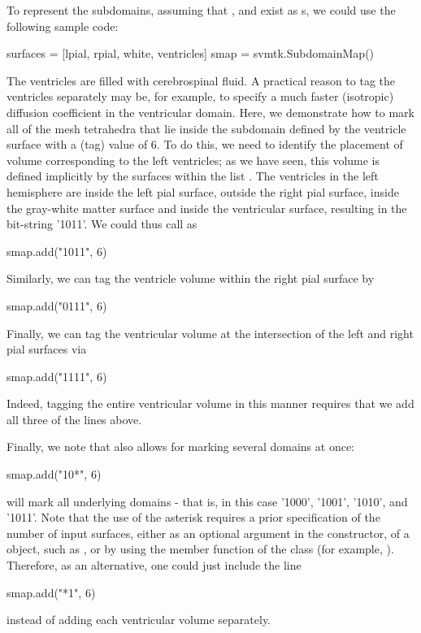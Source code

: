 To represent the subdomains, assuming that , and  exist as
s, we could use the following sample code:
\begin{python} 
surfaces = [lpial, rpial, white, ventricles]
smap = svmtk.SubdomainMap()
\end{python}
The ventricles are filled with cerebrospinal fluid. A practical
reason to tag the ventricles separately may be, for example, to
specify a much faster (isotropic) diffusion coefficient in the
ventricular domain. Here, we demonstrate how to mark all of the mesh
tetrahedra that lie inside the subdomain defined by the ventricle
surface with a (tag) value of 6. To do this, we need to identify the
placement of volume corresponding to the left ventricles; as we have
seen, this volume is defined implicitly by the surfaces within the
list . The ventricles in the left hemisphere
are inside the left pial surface, outside the right pial surface,
inside the gray-white matter surface and inside the ventricular
surface, resulting in the bit-string '1011'. We could thus call
 as
\begin{python}
smap.add("1011", 6)
\end{python}
Similarly, we can tag the ventricle volume within the right pial
surface by
\begin{python}
smap.add("0111", 6)
\end{python}
Finally, we can tag the ventricular volume at the intersection of the
left and right pial surfaces via
\begin{python}
smap.add("1111", 6)
\end{python}
Indeed, tagging the entire ventricular volume in this manner requires that we add all
three of the lines above.

Finally, we note that {\svmtk} also allows for marking several
domains at once:
\begin{python}
smap.add("10*", 6)
\end{python}
will mark all underlying domains - that is, in this case '1000',
'1001', '1010', and '1011'. Note that the use of the asterisk
requires a prior specification of the number of input surfaces, either
as an optional argument in the constructor, of a
 object, such as , or by
using the member function  of
the  class (for example,
). Therefore, as an
alternative, one could just include the line
\begin{python}
smap.add("*1", 6)
\end{python}
instead of adding each ventricular volume separately.

